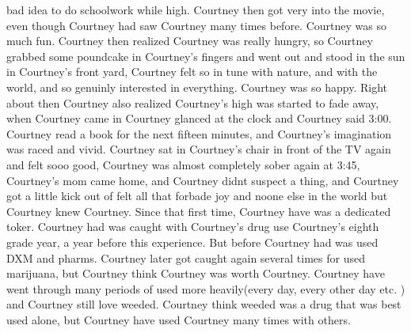 \documentclass[12pt]{book}
\begin{document}
bad idea to do schoolwork while high. Courtney then got very into the movie, even though Courtney had saw Courtney many times before. Courtney was so much fun. Courtney then realized Courtney was really hungry, so Courtney grabbed some poundcake in Courtney's fingers and went out and stood in the sun in Courtney's front yard, Courtney felt so in tune with nature, and with the world, and so genuinly interested in everything. Courtney was so happy. Right about then Courtney also realized Courtney's high was started to fade away, when Courtney came in Courtney glanced at the clock and Courtney said 3:00. Courtney read a book for the next fifteen minutes, and Courtney's imagination was raced and vivid. Courtney sat in Courtney's chair in front of the TV again and felt sooo good, Courtney was almost completely sober again at 3:45, Courtney's mom came home, and Courtney didnt suspect a thing, and Courtney got a little kick out of felt all that forbade joy and noone else in the world but Courtney knew Courtney. Since that first time, Courtney have was a dedicated toker. Courtney had was caught with Courtney's drug use Courtney's eighth grade year, a year before this experience. But before Courtney had was used DXM and pharms. Courtney later got caught again several times for used marijuana, but Courtney think Courtney was worth Courtney. Courtney have went through many periods of used more heavily(every day, every other day etc. ) and Courtney still love weeded. Courtney think weeded was a drug that was best used alone, but Courtney have used Courtney many times with others.
\end{document}
